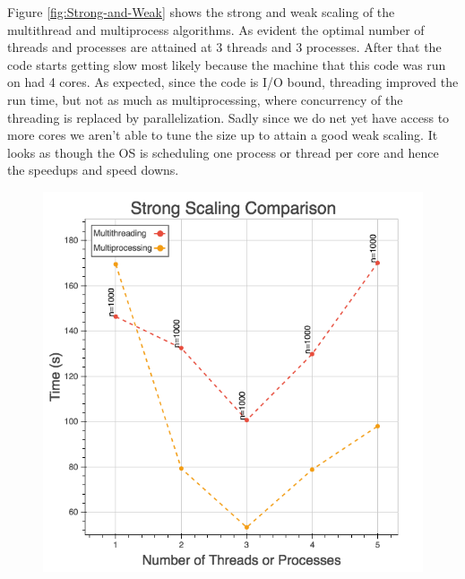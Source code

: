 \documentclass[10pt,twocolumn,letterpaper]{article}
\begin{document}
Figure \ref{fig:Strong-and-Weak} shows the strong and weak scaling
of the multithread and multiprocess algorithms. As evident the optimal
number of threads and processes are attained at 3 threads and 3 processes.
After that the code starts getting slow most likely because the machine
that this code was run on had 4 cores. As expected, since the code
is I/O bound, threading improved the run time, but not as much as
multiprocessing, where concurrency of the threading is replaced by
parallelization. Sadly since we do net yet have access to more cores
we aren't able to tune the size up to attain a good weak scaling.
It looks as though the OS is scheduling one process or thread per
core and hence the speedups and speed downs.

\begin{figure}[htbp] 
\begin{center}
\includegraphics[scale=0.45]{figure/mt_mp_ss_comp.png} \\

\end{center}
\end{figure}
\end{document}
